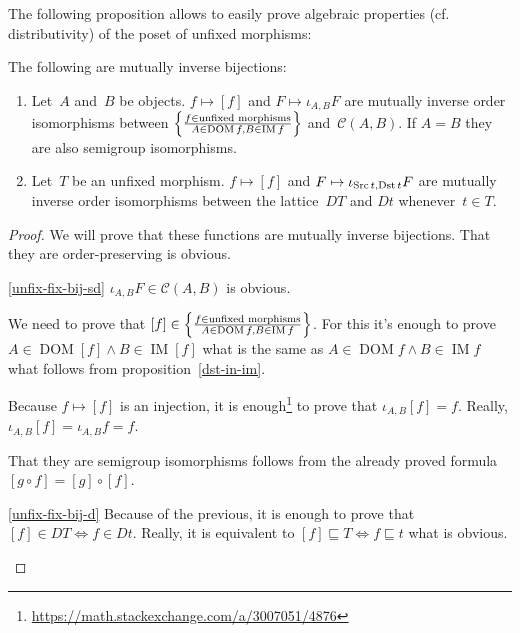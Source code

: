 The following proposition allows to easily prove algebraic
properties (cf. distributivity) of the poset of unfixed morphisms:

\begin{thm}\label{unfix-fix-bij}
The following are mutually inverse bijections:
\begin{enumerate}
\item\label{unfix-fix-bij-sd} Let~$A$ and~$B$ be objects. $f\mapsto[f]$ and $F\mapsto\iota_{A,B}F$
are mutually inverse order isomorphisms between
$\left\{ \frac{f\in\text{unfixed morphisms}}{A\in\operatorname{DOM}f,B\in\operatorname{IM}f}\right\}$
and~$\mathcal{C}(A,B)$.
If $A=B$ they are also semigroup isomorphisms.
\item\label{unfix-fix-bij-d} Let~$T$ be an unfixed morphism. $f\mapsto[f]$ and $F\mapsto\iota_{\operatorname{Src} t,\operatorname{Dst} t}F$ are mutually inverse order isomorphisms
between the lattice~$DT$ and $Dt$ whenever~$t\in T$.
\end{enumerate}
\end{thm}

\begin{proof}
We will prove that these functions are mutually inverse
bijections. That they are order-preserving is obvious.
\begin{widedisorder}
\item[\ref{unfix-fix-bij-sd}]
$\iota_{A,B}F\in\mathcal{C}(A,B)$ is obvious.

We need to prove that
$[f]\in\left\{ \frac{f\in\text{unfixed morphisms}}{A\in\operatorname{DOM}f,B\in\operatorname{IM}f}\right\}$.
For this it's enough to prove
$A\in\operatorname{DOM}[f]\land B\in\operatorname{IM}[f]$
what is the same as
$A\in\operatorname{DOM}f\land B\in\operatorname{IM}f$
what follows from proposition~\ref{dst-in-im}.

Because $f\mapsto[f]$ is an injection, it is
enough\footnote{\url{https://math.stackexchange.com/a/3007051/4876}}
to prove that 
$\iota_{A,B}[f]=f$. Really, $\iota_{A,B}[f]=\iota_{A,B}f=f$.

That they are semigroup isomorphisms follows from the
already proved formula $[g\circ f]=[g]\circ[f]$.

\item[\ref{unfix-fix-bij-d}]
Because of the previous, it is enough to prove that
$[f]\in DT\Leftrightarrow f\in Dt$. Really, it is equivalent
to $[f]\sqsubseteq T\Leftrightarrow f\sqsubseteq t$
what is obvious.
\end{widedisorder}
\end{proof}

